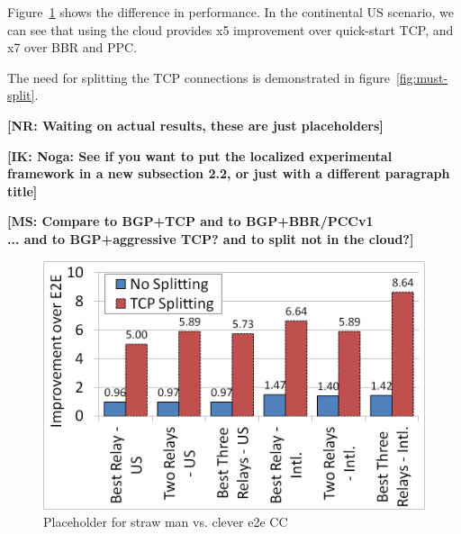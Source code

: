 \documentclass[10pt,sigconf]{acmart}
\newcommand{\mycomm}[3]{{\color{#2} \textbf{[#1: #3]}}}
\newcommand{\mycomm}[3]{}
\newcommand{\IK}[1]{\mycomm{IK}{blue}{#1}}
\newcommand{\NR}[1]{\mycomm{NR}{violet}{#1}}
\newcommand{\MS}[1]{\mycomm{MS}{red}{#1}}
\begin{document}
\vspace{0.1in} Figure~\ref{fig:cloud-vs-CC} shows the difference in performance. In the continental US scenario, we can see that using the cloud provides x5 improvement over quick-start TCP, and x7 over BBR and PPC.

\vspace{0.1in} The need for splitting the TCP connections is demonstrated in figure~\ref{fig:must-split}. 

\NR{Waiting on actual results, these are just placeholders}

\IK{Noga: See if you want to put the localized experimental framework in a new subsection 2.2, or just with a different paragraph title}



\MS{Compare to BGP+TCP and to BGP+BBR/PCCv1 \\
... and to BGP+aggressive TCP? and to split not in the cloud?}

\begin{figure}
  \centering
  \includegraphics[width=\columnwidth,trim=2mm 2mm 2mm 2mm,clip]{figures/tcp_splitting_aws.png}
  \caption{Placeholder for straw man vs. clever e2e CC}
 \label{fig:cloud-vs-CC}
\end{figure}
\end{document}
